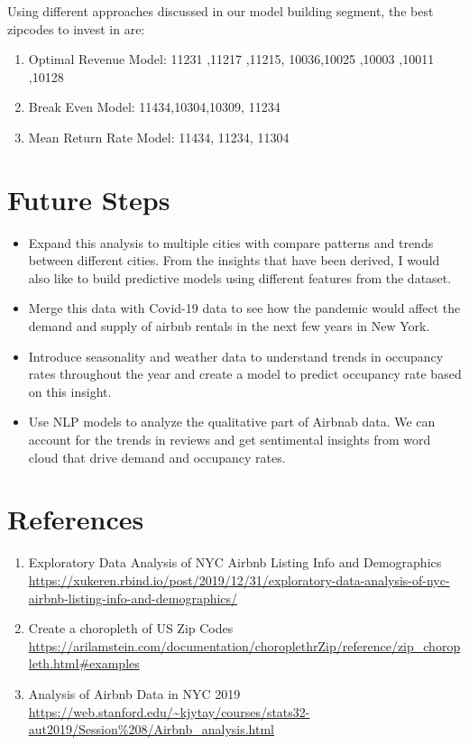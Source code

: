 \documentclass[
]{article}
\begin{document}
Using different approaches discussed in our model building segment, the
best zipcodes to invest in are:

\begin{enumerate}
\def\labelenumi{\arabic{enumi}.}
\item
  Optimal Revenue Model: 11231 ,11217 ,11215, 10036,10025 ,10003 ,10011
  ,10128
\item
  Break Even Model: 11434,10304,10309, 11234
\item
  Mean Return Rate Model: 11434, 11234, 11304
\end{enumerate}

\hypertarget{future-steps}{%
\section{Future Steps}\label{future-steps}}

\begin{itemize}
\item
  Expand this analysis to multiple cities with compare patterns and
  trends between different cities. From the insights that have been
  derived, I would also like to build predictive models using different
  features from the dataset.
\item
  Merge this data with Covid-19 data to see how the pandemic would
  affect the demand and supply of airbnb rentals in the next few years
  in New York.
\item
  Introduce seasonality and weather data to understand trends in
  occupancy rates throughout the year and create a model to predict
  occupancy rate based on this insight.
\item
  Use NLP models to analyze the qualitative part of Airbnab data. We can
  account for the trends in reviews and get sentimental insights from
  word cloud that drive demand and occupancy rates.
\end{itemize}

\hypertarget{references}{%
\section{References}\label{references}}

\begin{enumerate}
\def\labelenumi{\arabic{enumi}.}
\item
  Exploratory Data Analysis of NYC Airbnb Listing Info and Demographics
  \url{https://xukeren.rbind.io/post/2019/12/31/exploratory-data-analysis-of-nyc-airbnb-listing-info-and-demographics/}
\item
  Create a choropleth of US Zip Codes
  \url{https://arilamstein.com/documentation/choroplethrZip/reference/zip_choropleth.html\#examples}
\item
  Analysis of Airbnb Data in NYC 2019
  \url{https://web.stanford.edu/~kjytay/courses/stats32-aut2019/Session\%208/Airbnb_analysis.html}
\end{enumerate}
\end{document}
